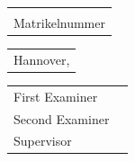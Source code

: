 \begin{titlepage}
\begin{spacing}{1}
			\begin{tabular}{l}
					\large{\Autor}\\
					\large{Matrikelnummer \AutorMatrikelNr}
				\end{tabular}
			
			\vspace{5mm}
			
			\begin{tabular}{l}
					\large{Hannover, \Datum}
				\end{tabular}
			
			
			\vspace{5mm}
			{\large
					\begin{tabular}{l l}						
							First Examiner  & \Erstpruefer\\
							Second Examiner & \Zweitpruefer\\
							Supervisor    	& \Betreuer\\
						\end{tabular}
				}
			
		\end{spacing}
\end{titlepage}
